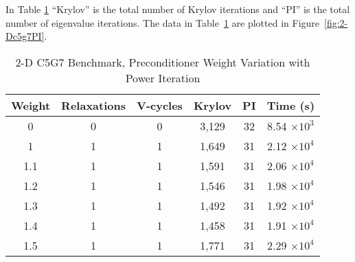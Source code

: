 In Table \ref{table:2-D c5g7} ``Krylov'' is the total number of Krylov iterations and ``PI'' is the total number of eigenvalue iterations. The data in Table~\ref{table:2-D c5g7} are plotted in Figure~\ref{fig:2-Dc5g7PI}.
%
\begin{table}[!h]
\caption{2-D C5G7 Benchmark, Preconditioner Weight Variation with Power Iteration}
\begin{center}
\begin{tabular}{|c |c |c |c |c |c|}
\hline
Weight & Relaxations & V-cycles & Krylov & PI & Time (s) \\[0.5ex]
\hline
0    & 0 & 0 & 3,129 & 32 & 8.54 $\times 10^{3}$ \\
1    & 1 & 1 & 1,649 & 31 & 2.12 $\times 10^{4}$ \\
1.1 & 1 & 1 & 1,591 & 31 & 2.06 $\times 10^{4}$ \\
1.2 & 1 & 1 & 1,546 & 31 & 1.98 $\times 10^{4}$ \\
1.3 & 1 & 1 & 1,492 & 31 & 1.92 $\times 10^{4}$ \\
1.4 & 1 & 1 & 1,458 & 31 & 1.91 $\times 10^{4}$ \\
1.5 & 1 & 1 & 1,771 & 31 & 2.29 $\times 10^{4}$ \\
\hline 
\end{tabular} 
\end{center}
\label{table:2-D c5g7}
\end{table}

